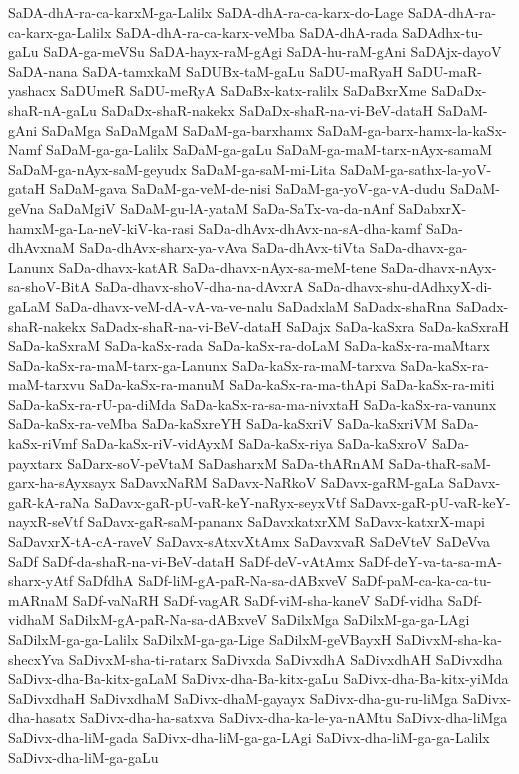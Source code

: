 {SaDA-dhA-ra-ca-karxM-ga-Lalilx
SaDA-dhA-ra-ca-karx-do-Lage
SaDA-dhA-ra-ca-karx-ga-Lalilx
SaDA-dhA-ra-ca-karx-veMba
SaDA-dhA-rada
SaDAdhx-tu-gaLu
SaDA-ga-meVSu
SaDA-hayx-raM-gAgi
SaDA-hu-raM-gAni
SaDAjx-dayoV
SaDA-nana
SaDA-tamxkaM
SaDUBx-taM-gaLu
SaDU-maRyaH
SaDU-maR-yashacx
SaDUmeR
SaDU-meRyA
SaDaBx-katx-ralilx
SaDaBxrXme
SaDaDx-shaR-nA-gaLu
SaDaDx-shaR-nakekx
SaDaDx-shaR-na-vi-BeV-dataH
SaDaM-gAni
SaDaMga
SaDaMgaM
SaDaM-ga-barxhamx
SaDaM-ga-barx-hamx-la-kaSx-Namf
SaDaM-ga-ga-Lalilx
SaDaM-ga-gaLu
SaDaM-ga-maM-tarx-nAyx-samaM
SaDaM-ga-nAyx-saM-geyudx
SaDaM-ga-saM-mi-Lita
SaDaM-ga-sathx-la-yoV-gataH
SaDaM-gava
SaDaM-ga-veM-de-nisi
SaDaM-ga-yoV-ga-vA-dudu
SaDaM-geVna
SaDaMgiV
SaDaM-gu-lA-yataM
SaDa-SaTx-va-da-nAnf
SaDabxrX-hamxM-ga-La-neV-kiV-ka-rasi
SaDa-dhAvx-dhAvx-na-sA-dha-kamf
SaDa-dhAvxnaM
SaDa-dhAvx-sharx-ya-vAva
SaDa-dhAvx-tiVta
SaDa-dhavx-ga-Lanunx
SaDa-dhavx-katAR
SaDa-dhavx-nAyx-sa-meM-tene
SaDa-dhavx-nAyx-sa-shoV-BitA
SaDa-dhavx-shoV-dha-na-dAvxrA
SaDa-dhavx-shu-dAdhxyX-di-gaLaM
SaDa-dhavx-veM-dA-vA-va-ve-nalu
SaDadxlaM
SaDadx-shaRna
SaDadx-shaR-nakekx
SaDadx-shaR-na-vi-BeV-dataH
SaDajx
SaDa-kaSxra
SaDa-kaSxraH
SaDa-kaSxraM
SaDa-kaSx-rada
SaDa-kaSx-ra-doLaM
SaDa-kaSx-ra-maMtarx
SaDa-kaSx-ra-maM-tarx-ga-Lanunx
SaDa-kaSx-ra-maM-tarxva
SaDa-kaSx-ra-maM-tarxvu
SaDa-kaSx-ra-manuM
SaDa-kaSx-ra-ma-thApi
SaDa-kaSx-ra-miti
SaDa-kaSx-ra-rU-pa-diMda
SaDa-kaSx-ra-sa-ma-nivxtaH
SaDa-kaSx-ra-vanunx
SaDa-kaSx-ra-veMba
SaDa-kaSxreYH
SaDa-kaSxriV
SaDa-kaSxriVM
SaDa-kaSx-riVmf
SaDa-kaSx-riV-vidAyxM
SaDa-kaSx-riya
SaDa-kaSxroV
SaDa-payxtarx
SaDarx-soV-peVtaM
SaDasharxM
SaDa-thARnAM
SaDa-thaR-saM-garx-ha-sAyxsayx
SaDavxNaRM
SaDavx-NaRkoV
SaDavx-gaRM-gaLa
SaDavx-gaR-kA-raNa
SaDavx-gaR-pU-vaR-keY-naRyx-seyxVtf
SaDavx-gaR-pU-vaR-keY-nayxR-seVtf
SaDavx-gaR-saM-pananx
SaDavxkatxrXM
SaDavx-katxrX-mapi
SaDavxrX-tA-cA-raveV
SaDavx-sAtxvXtAmx
SaDavxvaR
SaDeVteV
SaDeVva
SaDf
SaDf-da-shaR-na-vi-BeV-dataH
SaDf-deV-vAtAmx
SaDf-deY-va-ta-sa-mA-sharx-yAtf
SaDfdhA
SaDf-liM-gA-paR-Na-sa-dABxveV
SaDf-paM-ca-ka-ca-tu-mARnaM
SaDf-vaNaRH
SaDf-vagAR
SaDf-viM-sha-kaneV
SaDf-vidha
SaDf-vidhaM
SaDilxM-gA-paR-Na-sa-dABxveV
SaDilxMga
SaDilxM-ga-ga-LAgi
SaDilxM-ga-ga-Lalilx
SaDilxM-ga-ga-Lige
SaDilxM-geVBayxH
SaDivxM-sha-ka-shecxYva
SaDivxM-sha-ti-ratarx
SaDivxda
SaDivxdhA
SaDivxdhAH
SaDivxdha
SaDivx-dha-Ba-kitx-gaLaM
SaDivx-dha-Ba-kitx-gaLu
SaDivx-dha-Ba-kitx-yiMda
SaDivxdhaH
SaDivxdhaM
SaDivx-dhaM-gayayx
SaDivx-dha-gu-ru-liMga
SaDivx-dha-hasatx
SaDivx-dha-ha-satxva
SaDivx-dha-ka-le-ya-nAMtu
SaDivx-dha-liMga
SaDivx-dha-liM-gada
SaDivx-dha-liM-ga-ga-LAgi
SaDivx-dha-liM-ga-ga-Lalilx
SaDivx-dha-liM-ga-gaLu
}
